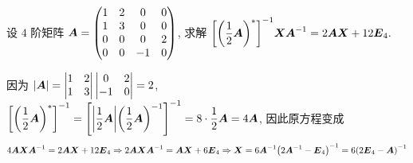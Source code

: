 \begin{example}
    设 $4$ 阶矩阵 $\vb*{A}=\begin{pmatrix}
            1 & 2 & 0  & 0 \\
            1 & 3 & 0  & 0 \\
            0 & 0 & 0  & 2 \\
            0 & 0 & -1 & 0
        \end{pmatrix}$, 求解 $\qty[\qty(\dfrac{1}{2}\vb*{A})^*]^{-1}\vb*{XA}^{-1}=2\vb*{AX}+12\vb*{E}_4.$
\end{example}
\begin{solution}
    因为 $|\vb*{A}|=\begin{vmatrix}
            1 & 2 \\
            1 & 3
        \end{vmatrix}
        \begin{vmatrix}
            0  & 2 \\
            -1 & 0
        \end{vmatrix}=2$, $\qty[\qty(\dfrac{1}{2}\vb*{A})^*]^{-1}=\qty[\qty|\dfrac{1}{2}\vb*{A}|\qty(\dfrac{1}{2}\vb*{A})^{-1}]^{-1}=8\cdot \dfrac{1}{2}\vb*{A}=4\vb*{A}$,
    因此原方程变成 $$4\vb*{AXA}^{-1}=2\vb*{AX}+12\vb*{E}_4\Rightarrow 2\vb*{AXA}^{-1}=\vb*{AX}+6\vb*{E}_4\Rightarrow \vb*{X}=6\vb*{A}^{-1}\qty(2\vb*{A}^{-1}-\vb*{E}_4)^{-1}=6\qty(2\vb*{E}_4-\vb*{A})^{-1}$$
\end{solution}
